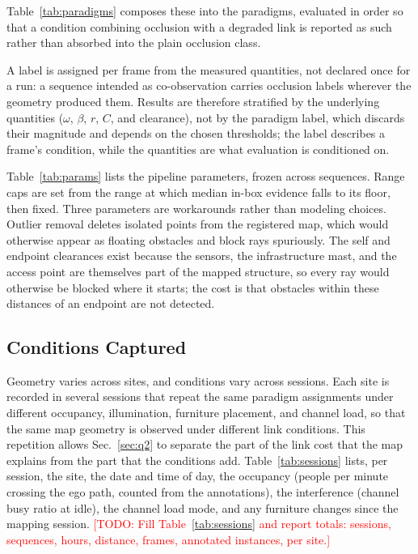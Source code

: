\documentclass[conference]{IEEEtran}
\newcommand{\todo}[1]{\textcolor{red}{[TODO: #1]}}
\begin{document}


Table~\ref{tab:paradigms} composes these into the paradigms, evaluated
in order so that a condition combining occlusion with a degraded link
is reported as such rather than absorbed into the plain occlusion
class.



A label is assigned per frame from the measured quantities, not
declared once for a run: a sequence intended as co-observation carries
occlusion labels wherever the geometry produced them. Results are
therefore stratified by the underlying quantities ($\omega$, $\beta$,
$r$, $C$, and clearance), not by the paradigm label, which discards
their magnitude and depends on the chosen thresholds; the label
describes a frame's condition, while the quantities are what
evaluation is conditioned on.



Table~\ref{tab:params} lists the pipeline parameters, frozen across
sequences. Range caps are set from the range at which median in-box
evidence falls to its floor, then fixed. Three parameters are
workarounds rather than modeling choices. Outlier removal deletes
isolated points from the registered map, which would otherwise appear
as floating obstacles and block rays spuriously. The self and
endpoint clearances exist because the sensors, the infrastructure
mast, and the access point are themselves part of the mapped
structure, so every ray would otherwise be blocked where it starts;
the cost is that obstacles within these distances of an endpoint are
not detected.

\subsection{Conditions Captured}
\label{sec:conditions}
Geometry varies across sites, and conditions vary across sessions.
Each site is recorded in several sessions that repeat the same
paradigm assignments under different occupancy, illumination,
furniture placement, and channel load, so that the same map geometry
is observed under different link conditions. This repetition allows
Sec.~\ref{sec:q2} to separate the part of the link cost that the map
explains from the part that the conditions add.
Table~\ref{tab:sessions} lists, per session, the site, the date and
time of day, the occupancy (people per minute crossing the ego path,
counted from the annotations), the interference (channel busy ratio
at idle), the channel load mode, and any furniture changes since the
mapping session. \todo{Fill Table~\ref{tab:sessions} and report
totals: sessions, sequences, hours, distance, frames, annotated
instances, per site.}
\end{document}
